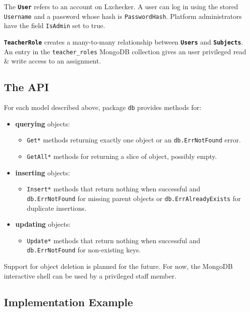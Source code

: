 The \textbf{\texttt{User}} refers to an account on Lxchecker. A user can log in using the stored \texttt{Username} and a password whose hash is \texttt{PasswordHash}. Platform administrators have the field \texttt{IsAdmin} set to true.

\textbf{\texttt{TeacherRole}} creates a many-to-many relationship between \textbf{\texttt{Users}} and \textbf{\texttt{Subjects}}. An entry in the \texttt{teacher_roles} MongoDB collection gives an user privileged read \& write access to an assignment.

\subsection{The API}
\label{sub-sec:db-api}

For each model described above, package \texttt{db} provides methods for:
\begin{itemize}
	\item \textbf{querying} objects:
		\begin{itemize}
			\item \texttt{Get*} methods returning exactly one object or an \texttt{db.ErrNotFound} error.
			\item \texttt{GetAll*} methods for returning a slice of object, possibly empty.
		\end{itemize}
	\item \textbf{inserting} objects:
		\begin{itemize}
			\item \texttt{Insert*} methods that return nothing when successful and \texttt{db.ErrNotFound} for missing parent objects or \texttt{db.ErrAlreadyExists} for duplicate insertions.
		\end{itemize}
	\item \textbf{updating} objects:
		\begin{itemize}
			\item \texttt{Update*} methods that return nothing when successful and \texttt{db.ErrNotFound} for non-existing keys.
		\end{itemize}
\end{itemize}

Support for object deletion is planned for the future. For now, the MongoDB interactive shell can be used by a privileged staff member.

\subsection{Implementation Example}
\label{sub-sec:db-implementation}

